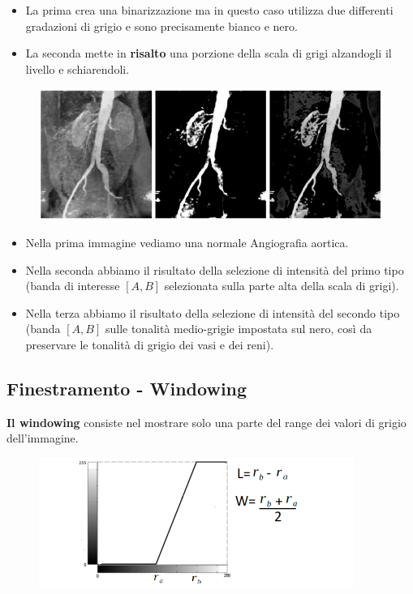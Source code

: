 \begin{itemize}
    \item La prima crea una binarizzazione ma in questo caso utilizza due differenti gradazioni di grigio e sono precisamente bianco e nero.
    \item La seconda mette in \textbf{risalto} una porzione della scala di grigi alzandogli il livello e schiarendoli.
\end{itemize}

\begin{figure}[H]
    \centering
    \includegraphics[width=\linewidth, keepaspectratio]{capitoli/immagini/imgs/angiografie_esempio_7.jpg}
\end{figure}

\begin{itemize}
    \item Nella prima immagine vediamo una normale Angiografia aortica.
    \item Nella seconda abbiamo il risultato della selezione di intensità del primo tipo (banda di
          interesse $[A, B]$ selezionata sulla parte alta della scala di grigi).
    \item Nella terza abbiamo il risultato della selezione di intensità del secondo tipo (banda
          $[A, B]$ sulle tonalità medio-grigie impostata sul nero, così da
          preservare le tonalità di grigio dei vasi e dei reni).
\end{itemize}

\subsection{Finestramento - Windowing}

\begin{definition}
    \textbf{Il windowing} consiste nel mostrare solo una parte del range dei valori di grigio dell'immagine.
\end{definition}

\begin{figure}[H]
    \centering
    \includegraphics[width=\linewidth, keepaspectratio]{capitoli/immagini/imgs/win1.png}
\end{figure}


